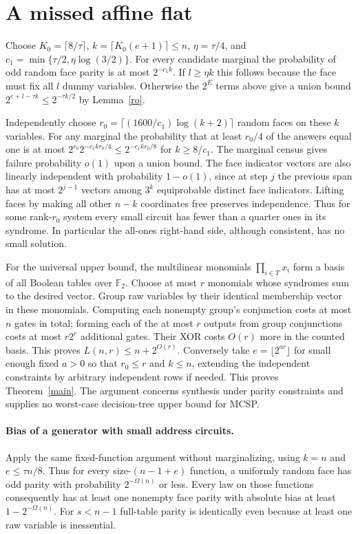 \documentclass[11pt]{article}
\newcommand{\F}{\mathbb F_2}
\begin{document}
\section{A missed affine flat}
Choose $K_0=\lceil8/\tau\rceil$, $k=\lceil K_0(e+1)\rceil\le n$, $\eta=\tau/4$, and $c_1=\min\{\tau/2,\eta\log(3/2)\}$. For every candidate marginal the probability of odd random face parity is at most $2^{-c_1k}$. If $l\ge\eta k$ this follows because the face must fix all $l$ dummy variables. Otherwise the $2^E$ terms above give a union bound $2^{e+l-\tau k}\le2^{-\tau k/2}$ by Lemma~\ref{ro}.

Independently choose $r_0=\lceil(1600/c_1)\log(k+2)\rceil$ random faces on these $k$ variables. For any marginal the probability that at least $r_0/4$ of the answers equal one is at most $2^{r_0}2^{-c_1kr_0/4}\le2^{-c_1kr_0/8}$ for $k\ge8/c_1$. The marginal census gives failure probability $o(1)$ upon a union bound. The face indicator vectors are also linearly independent with probability $1-o(1)$, since at step $j$ the previous span has at most $2^{j-1}$ vectors among $3^k$ equiprobable distinct face indicators. Lifting faces by making all other $n-k$ coordinates free preserves independence. Thus for some rank-$r_0$ system every small circuit has fewer than a quarter ones in its syndrome. In particular the all-ones right-hand side, although consistent, has no small solution.

For the universal upper bound, the multilinear monomials $\prod_{i\in T}x_i$ form a basis of all Boolean tables over $\F$. Choose at most $r$ monomials whose syndromes sum to the desired vector. Group raw variables by their identical membership vector in these monomials. Computing each nonempty group's conjunction costs at most $n$ gates in total; forming each of the at most $r$ outputs from group conjunctions costs at most $r2^r$ additional gates. Their XOR costs $O(r)$ more in the counted basis. This proves $L(n,r)\le n+2^{O(r)}$. Conversely take $e=\lfloor2^{a r}\rfloor$ for small enough fixed $a>0$ so that $r_0\le r$ and $k\le n$, extending the independent constraints by arbitrary independent rows if needed. This proves Theorem~\ref{main}. The argument concerns synthesis under parity constraints and supplies no worst-case decision-tree upper bound for MCSP.

\paragraph{Bias of a generator with small address circuits.}
Apply the same fixed-function argument without marginalizing, using $k=n$ and $e\le\tau n/8$. Thus for every size-$(n-1+e)$ function, a uniformly random face has odd parity with probability $2^{-\Omega(n)}$ or less. Every law on those functions consequently has at least one nonempty face parity with absolute bias at least $1-2^{-\Omega(n)}$. For $s<n-1$ full-table parity is identically even because at least one raw variable is inessential.
\end{document}
